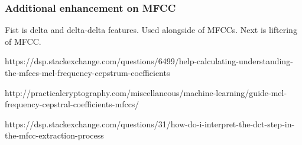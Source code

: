 \documentclass{article}
\begin{document}
\subsubsection{Additional enhancement on MFCC}
Fist is delta and delta-delta features. Used alongside of MFCCs.
Next is liftering of MFCC.



\begin{thebibliography}{9}
https://dsp.stackexchange.com/questions/6499/help-calculating-understanding-the-mfccs-mel-frequency-cepstrum-coefficients 

http://practicalcryptography.com/miscellaneous/machine-learning/guide-mel-frequency-cepstral-coefficients-mfccs/ 

https://dsp.stackexchange.com/questions/31/how-do-i-interpret-the-dct-step-in-the-mfcc-extraction-process 
\end{thebibliography}
\end{document}
